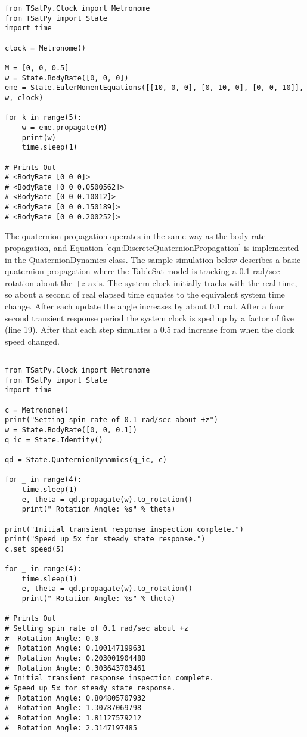 \begin{singlespace}
  \begin{verbatim}
from TSatPy.Clock import Metronome
from TSatPy import State
import time

clock = Metronome()

M = [0, 0, 0.5]
w = State.BodyRate([0, 0, 0])
eme = State.EulerMomentEquations([[10, 0, 0], [0, 10, 0], [0, 0, 10]], w, clock)

for k in range(5):
    w = eme.propagate(M)
    print(w)
    time.sleep(1)

# Prints Out
# <BodyRate [0 0 0]>
# <BodyRate [0 0 0.0500562]>
# <BodyRate [0 0 0.10012]>
# <BodyRate [0 0 0.150189]>
# <BodyRate [0 0 0.200252]>
  \end{verbatim}
\nocite{minted}
\end{singlespace}

The quaternion propagation operates in the same way as the body rate propagation, and Equation \ref{eqn:DiscreteQuaternionPropagation} is implemented in the QuaternionDynamics class.  The sample simulation below describes a basic quaternion propagation where the TableSat model is tracking a 0.1 rad/sec rotation about the $+z$ axis.  The system clock initially tracks with the real time, so about a second of real elapsed time equates to the equivalent system time change.  After each update the angle increases by about 0.1 rad.  After a four second transient response period the system clock is sped up by a factor of five (line 19).  After that each step simulates a 0.5 rad increase from when the clock speed changed.

\begin{singlespace}
  \begin{verbatim}

from TSatPy.Clock import Metronome
from TSatPy import State
import time

c = Metronome()
print("Setting spin rate of 0.1 rad/sec about +z")
w = State.BodyRate([0, 0, 0.1])
q_ic = State.Identity()

qd = State.QuaternionDynamics(q_ic, c)

for _ in range(4):
    time.sleep(1)
    e, theta = qd.propagate(w).to_rotation()
    print(" Rotation Angle: %s" % theta)

print("Initial transient response inspection complete.")
print("Speed up 5x for steady state response.")
c.set_speed(5)

for _ in range(4):
    time.sleep(1)
    e, theta = qd.propagate(w).to_rotation()
    print(" Rotation Angle: %s" % theta)

# Prints Out
# Setting spin rate of 0.1 rad/sec about +z
#  Rotation Angle: 0.0
#  Rotation Angle: 0.100147199631
#  Rotation Angle: 0.203001904488
#  Rotation Angle: 0.303643703461
# Initial transient response inspection complete.
# Speed up 5x for steady state response.
#  Rotation Angle: 0.804805707932
#  Rotation Angle: 1.30787069798
#  Rotation Angle: 1.81127579212
#  Rotation Angle: 2.3147197485
  \end{verbatim}
  \nocite{minted}
\end{singlespace}






